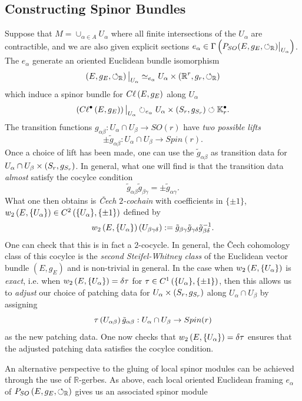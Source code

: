 \documentclass[openany, 11pt]{article}
\theoremstyle{definition}
\theoremstyle{remark}
\def\lp{\ensuremath{\left(}}
\def\rp{\ensuremath{\right)}}
\def\cal{\ensuremath{\boldsymbol{\circlearrowleft}}}
\def\bR{\ensuremath{\mathbb{R}}}
\def\bK{\ensuremath{\mathbb{K}}}
\begin{document}
\subsection{Constructing Spinor Bundles}
Suppose that $M=\cup_{\alpha\in A}U_{\alpha}$ where all finite intersections of the $U_{\alpha}$ are contractible, and we are also given explicit sections $e_{\alpha}\in \Gamma\lp P_{SO}(E,g_E,\cal_{\bR})\big|_{U_\alpha}\rp$. The $e_{\alpha}$ generate an oriented Euclidean bundle isomorphism
\[
    \lp E,g_E,\cal_{\bR}\rp\big|_{U_{\alpha}}\simeq_{e_{\alpha}} U_{\alpha}\times\lp\bR^r,g_r,\cal_{\bR}\rp
\]
which induce a spinor bundle for $C\ell\lp E,g_E\rp$ along $U_{\alpha}$
\[
    \lp C\ell^{\bullet}\lp E,g_E\rp\rp\big|_{U_{\alpha}}\circlearrowright_{e_{\alpha}}U_{\alpha}\times\lp S_r,g_{S_r}\rp\circlearrowleft\bK^{\bullet}_r.
\]
The transition functions $g_{\alpha\beta}:U_{\alpha}\cap U_{\beta}\rightarrow SO(r)$ have \emph{two possible lifts}
\[
    \pm \tilde{g}_{\alpha\beta}:U_{\alpha}\cap U_{\beta}\rightarrow Spin(r).
\]
Once a choice of lift has been made, one can use the $\tilde{g}_{\alpha\beta}$ as transition data for $U_{\alpha}\cap U_{\beta}\times \lp S_r,g_{S_r}\rp$. In general, what one will find is that the transition data \emph{almost} satisfy the cocylce condition
\[
    \tilde{g}_{\alpha\beta}\tilde{g}_{\beta\gamma}=\pm \tilde{g}_{\alpha\gamma}.
\]
What one then obtains is \emph{\v{C}ech $2$-cochain} with coefficients in $\{\pm 1\}$,\newline $w_2\lp E,\{ U_{\alpha}\}\rp\in C^2\lp \{U_{\alpha}\},\{\pm1\}\rp$ defined by
\[
    w_2\lp E,\{U_{\alpha}\}\rp\lp U_{\beta\gamma\delta}\rp:=\tilde{g}_{\beta\gamma}\tilde{g}_{\gamma\delta}\tilde{g}_{\beta\delta}^{-1}.
\]
One can check that this is in fact a $2$-cocycle. In general, the \v{C}ech cohomology class of this cocylce is the \emph{second Steifel-Whitney class} of the Euclidean vector bundle $(E,g_E)$ and is non-trivial in general. In the case when $w_2\lp E,\{ U_{\alpha}\}\rp$ is \emph{exact}, i.e. when $w_2\lp E,\{ U_{\alpha}\}\rp=\delta \tau$ for $\tau\in C^1\lp\{ U_{\alpha}\},\{\pm 1\}\rp$, then this allows us to \emph{adjust} our choice of patching data for $U_{\alpha}\times\lp S_r,g_{S_r}\rp$ along $U_{\alpha}\cap U_{\beta}$ by assigning
\[
    \tau\lp U_{\alpha\beta}\rp\tilde{g}_{\alpha\beta}:U_{\alpha}\cap U_{\beta}\rightarrow Spin(r)
\]
as the new patching data. One now checks that $w_2\lp E,\{U_{\alpha}\}\rp=\delta\tau$ ensures that the adjusted patching data satisfies the cocylce condition.\par
An alternative perspective to the gluing of local spinor modules can be achieved through the use of $\bR$-gerbes. As above, each local oriented Euclidean framing $e_{\alpha}$ of $P_{SO}\lp E,g_E,\cal_{\bR}\rp$ gives us an associated spinor module
\end{document}
